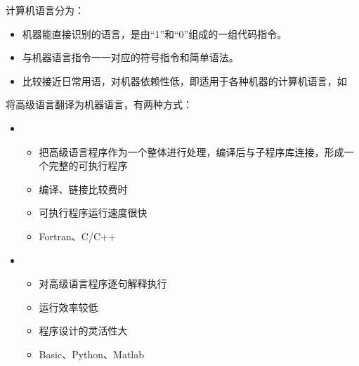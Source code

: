 \begin{frame}
计算机语言分为：

\begin{itemize}
\item {}\quad 机器能直接识别的语言，是由“1”和“0”组成的一组代码指令。\\[0.1in]
\item {}\quad 与机器语言指令一一对应的符号指令和简单语法。\\[0.1in]
\item {}\quad 比较接近日常用语，对机器依赖性低，即适用于各种机器的计算机语言，如
\end{itemize}
\end{frame}

\begin{frame}

将高级语言翻译为机器语言，有两种方式： \vspace{0.05in}

\begin{itemize}
\item{} \\[0.1in]
\begin{itemize}
	\item {}\quad 把高级语言程序作为一个整体进行处理，编译后与子程序库连接，形成一个完整的可执行程序 \\[0.1in]
	\item {}\quad 编译、链接比较费时\\[0.1in]
	\item {}\quad 可执行程序运行速度很快 \\[0.1in]
	\item {}\quad Fortran、C/C++ \\[0.1in]
\end{itemize}

\item{} \\[0.1in]
\begin{itemize}
	\item {}\quad 对高级语言程序逐句解释执行\\[0.1in]
	\item {}\quad 运行效率较低\\[0.1in]
	\item {}\quad 程序设计的灵活性大\\[0.1in]
	\item {}\quad Basic、Python、Matlab
\end{itemize}
\end{itemize}
\end{frame}